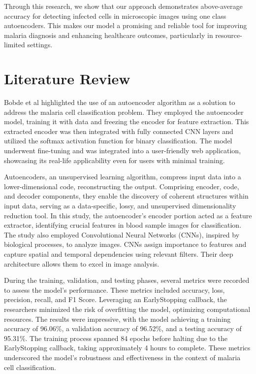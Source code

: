 \documentclass[journal,11pt,onecolumn,draftcls]{IEEEtran}
\begin{document}
Through this research, we show that our approach demonstrates above-average accuracy for detecting infected cells in microscopic images using one class autoencoders. This makes our model a promising and reliable tool for improving malaria diagnosis and enhancing healthcare outcomes, particularly in resource-limited settings.

\section{Literature Review}
Bobde et al \cite{bobde2022} highlighted the use of an autoencoder algorithm as a solution to address the malaria cell classification problem. They employed the autoencoder model, training it with data and freezing the encoder for feature extraction. This extracted encoder was then integrated with fully connected CNN layers and utilized the softmax activation function for binary classification. The model underwent fine-tuning and was integrated into a user-friendly web application, showcasing its real-life applicability even for users with minimal training.

Autoencoders, an unsupervised learning algorithm, compress input data into a lower-dimensional code, reconstructing the output. Comprising encoder, code, and decoder components, they enable the discovery of coherent structures within input data, serving as a data-specific, lossy, and unsupervised dimensionality reduction tool. In this study, the autoencoder's encoder portion acted as a feature extractor, identifying crucial features in blood sample images for classification. The study also employed Convolutional Neural Networks (CNNs), inspired by biological processes, to analyze images. CNNs assign importance to features and capture spatial and temporal dependencies using relevant filters. Their deep architecture allows them to excel in image analysis.

During the training, validation, and testing phases, several metrics were recorded to assess the model's performance. These metrics included accuracy, loss, precision, recall, and F1 Score. Leveraging an EarlyStopping callback, the researchers minimized the risk of overfitting the model, optimizing computational resources. The results were impressive, with the model achieving a training accuracy of 96.06\%, a validation accuracy of 96.52\%, and a testing accuracy of 95.31\%. The training process spanned 84 epochs before halting due to the EarlyStopping callback, taking approximately 4 hours to complete. These metrics underscored the model's robustness and effectiveness in the context of malaria cell classification.
\end{document}
